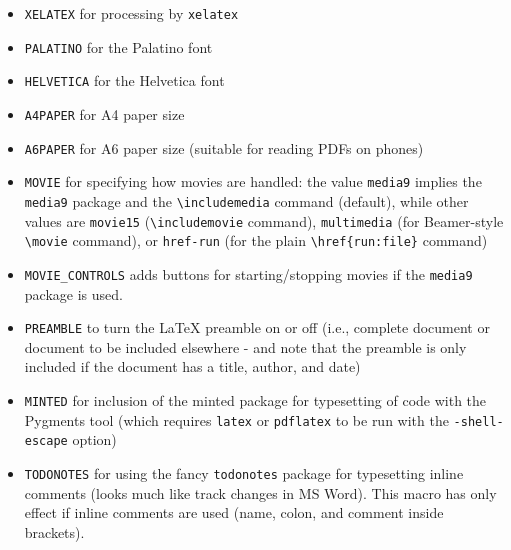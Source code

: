 \documentclass[%
oneside,                 %
final,                   %
10pt]{article}
\begin{document}
\begin{itemize}
 \item {\fontsize{10pt}{10pt}\Verb!XELATEX!} for processing by {\fontsize{10pt}{10pt}\Verb!xelatex!}

 \item {\fontsize{10pt}{10pt}\Verb!PALATINO!} for the Palatino font

 \item {\fontsize{10pt}{10pt}\Verb!HELVETICA!} for the Helvetica font

 \item {\fontsize{10pt}{10pt}\Verb!A4PAPER!} for A4 paper size

 \item {\fontsize{10pt}{10pt}\Verb!A6PAPER!} for A6 paper size (suitable for reading PDFs on phones)

 \item {\fontsize{10pt}{10pt}\Verb!MOVIE!} for specifying how movies are handled: the value {\fontsize{10pt}{10pt}\Verb!media9!}
   implies the {\fontsize{10pt}{10pt}\Verb!media9!} package and the {\fontsize{10pt}{10pt}\Verb!\includemedia!} command (default),
   while other values are {\fontsize{10pt}{10pt}\Verb!movie15!} ({\fontsize{10pt}{10pt}\Verb!\includemovie!} command),
   {\fontsize{10pt}{10pt}\Verb!multimedia!} (for Beamer-style {\fontsize{10pt}{10pt}\Verb!\movie!} command),
   or {\fontsize{10pt}{10pt}\Verb!href-run!} (for the plain {\fontsize{10pt}{10pt}\Verb!\href{run:file}!} command)

 \item {\fontsize{10pt}{10pt}\Verb!MOVIE_CONTROLS!} adds buttons for starting/stopping movies if the
   {\fontsize{10pt}{10pt}\Verb!media9!} package is used.

 \item {\fontsize{10pt}{10pt}\Verb!PREAMBLE!} to turn the {\LaTeX} preamble on or off (i.e., complete document
   or document to be included elsewhere - and note that
   the preamble is only included
   if the document has a title, author, and date)

 \item {\fontsize{10pt}{10pt}\Verb!MINTED!} for inclusion of the minted package for typesetting of
   code with the Pygments tool (which requires {\fontsize{10pt}{10pt}\Verb!latex!}
   or {\fontsize{10pt}{10pt}\Verb!pdflatex!} to be run with the {\fontsize{10pt}{10pt}\Verb!-shell-escape!} option)

 \item {\fontsize{10pt}{10pt}\Verb!TODONOTES!} for using the fancy {\fontsize{10pt}{10pt}\Verb!todonotes!} package for typesetting
   inline comments (looks much like track changes in MS Word). This
   macro has only effect if inline comments are used (name, colon,
   and comment inside brackets).


\end{itemize}
\end{document}
